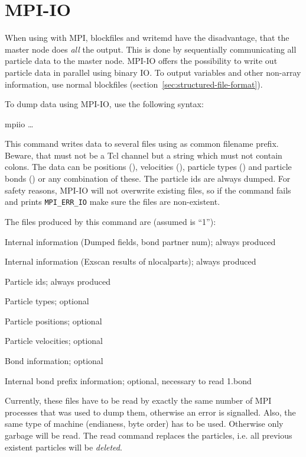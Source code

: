 \section{MPI-IO}

When using \es with MPI, blockfiles and writemd have the disadvantage,
that the master node does \textit{all} the output. This is done by
sequentially communicating all particle data to the master node. MPI-IO
offers the possibility to write out particle data in parallel using
binary IO. To output variables and other non-array information, use
normal blockfiles (section~\ref{sec:structured-file-format}).

To dump data using MPI-IO, use the following syntax:
\begin{essyntax}
  mpiio   \dots
\end{essyntax}
This command writes data to several files using  as
common filename prefix. Beware, that  must not be a Tcl channel
but a string which must not contain colons. The data can be positions
(), velocities (), particle types () and
particle bonds () or any combination of these. The particle ids
are always dumped. For safety reasons, MPI-IO will not overwrite existing
files, so if the command fails and prints \texttt{MPI_ERR_IO} make sure the
files are non-existent.

The files produced by this command are (assumed  is
``1''):
\begin{description}[align=right,labelwidth=2cm]
  \item [1.head] Internal information (Dumped fields, bond partner num); always produced
  \item [1.pref] Internal information (Exscan results of nlocalparts);
    always produced
  \item [1.ids] Particle ids; always produced
  \item [1.type] Particle types; optional
  \item [1.pos] Particle positions; optional
  \item [1.vel] Particle velocities; optional
  \item [1.bond] Bond information; optional
  \item [1.boff] Internal bond prefix information; optional, necessary
    to read 1.bond
\end{description}

Currently, these files have to be read by exactly the same number of MPI
processes that was used to dump them, otherwise an error is
signalled. Also, the same type of machine (endianess, byte order) has to
be used. Otherwise only garbage will be read. The read command replaces
the particles, i.e. all previous existent particles will be
\textit{deleted}.


